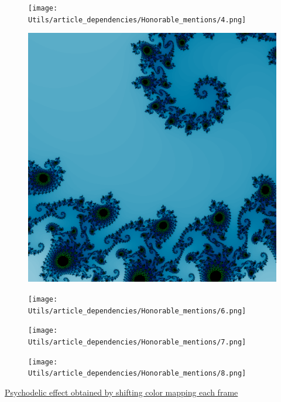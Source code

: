 \documentclass{article}
\begin{document}
\begin{figure}[H]
	\texttt{[image: Utils/article\_dependencies/Honorable\_mentions/4.png]}
\end{figure}

\begin{figure}[H]
	\includegraphics[width=\linewidth]{Utils/article_dependencies/Honorable_mentions/5.png}
\end{figure}

\begin{figure}[H]
	\texttt{[image: Utils/article\_dependencies/Honorable\_mentions/6.png]}
\end{figure}

\begin{figure}[H]
	\texttt{[image: Utils/article\_dependencies/Honorable\_mentions/7.png]}
\end{figure}

\begin{figure}[H]
	\texttt{[image: Utils/article\_dependencies/Honorable\_mentions/8.png]}
\end{figure}

\begin{center}
	\footnotesize
	\href{run:Utils/article_dependencies/Implementation_chapter/render_10.gif}{Psychodelic effect obtained by shifting color mapping each frame}
\end{center}

\pagebreak
\printbibliography[heading=bibintoc, title={References}]
\end{document}

